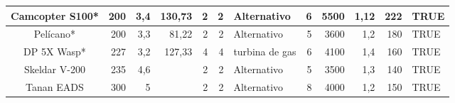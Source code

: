 \begin{table}[htbp]
\begin{tabular}{|c|r|r|r|r|r|l|r|r|r|r|l|}
		\midrule
		\rowcolor[rgb]{ .329,  .506,  .208} \textcolor[rgb]{ 1,  1,  1}{Camcopter S100*} & \cellcolor[rgb]{ .659,  .816,  .553}200 & \cellcolor[rgb]{ .659,  .816,  .553}3,4 & \cellcolor[rgb]{ .659,  .816,  .553}130,73 & \cellcolor[rgb]{ .659,  .816,  .553}2 & \cellcolor[rgb]{ .659,  .816,  .553}2 & \cellcolor[rgb]{ .659,  .816,  .553}Alternativo & \cellcolor[rgb]{ .659,  .816,  .553}6 & \cellcolor[rgb]{ .659,  .816,  .553}5500 & \cellcolor[rgb]{ .659,  .816,  .553}1,12 & \cellcolor[rgb]{ .659,  .816,  .553}222 & \cellcolor[rgb]{ .659,  .816,  .553}TRUE \\
		\midrule
		\rowcolor[rgb]{ .329,  .506,  .208} \textcolor[rgb]{ 1,  1,  1}{Pelícano*} & \cellcolor[rgb]{ .659,  .816,  .553}200 & \cellcolor[rgb]{ .659,  .816,  .553}3,3 & \cellcolor[rgb]{ .659,  .816,  .553}81,22 & \cellcolor[rgb]{ .659,  .816,  .553}2 & \cellcolor[rgb]{ .659,  .816,  .553}2 & \cellcolor[rgb]{ .659,  .816,  .553}Alternativo & \cellcolor[rgb]{ .659,  .816,  .553}5 & \cellcolor[rgb]{ .659,  .816,  .553}3600 & \cellcolor[rgb]{ .659,  .816,  .553}1,2 & \cellcolor[rgb]{ .659,  .816,  .553}180 & \cellcolor[rgb]{ .659,  .816,  .553}TRUE \\
		\midrule
		\rowcolor[rgb]{ .329,  .506,  .208} \textcolor[rgb]{ 1,  1,  1}{DP 5X Wasp*} & \cellcolor[rgb]{ .659,  .816,  .553}227 & \cellcolor[rgb]{ .659,  .816,  .553}3,2 & \cellcolor[rgb]{ .659,  .816,  .553}127,33 & \cellcolor[rgb]{ .659,  .816,  .553}4 & \cellcolor[rgb]{ .659,  .816,  .553}4 & \cellcolor[rgb]{ .659,  .816,  .553}turbina de gas & \cellcolor[rgb]{ .659,  .816,  .553}6 & \cellcolor[rgb]{ .659,  .816,  .553}4100 & \cellcolor[rgb]{ .659,  .816,  .553}1,4 & \cellcolor[rgb]{ .659,  .816,  .553}160 & \cellcolor[rgb]{ .659,  .816,  .553}TRUE \\
		\midrule
		\rowcolor[rgb]{ .329,  .506,  .208} \textcolor[rgb]{ 1,  1,  1}{Skeldar V-200} & \cellcolor[rgb]{ .659,  .816,  .553}235 & \cellcolor[rgb]{ .659,  .816,  .553}4,6 & \cellcolor[rgb]{ 1,  1,  0} & \cellcolor[rgb]{ .659,  .816,  .553}2 & \cellcolor[rgb]{ .659,  .816,  .553}2 & \cellcolor[rgb]{ .659,  .816,  .553}Alternativo & \cellcolor[rgb]{ .659,  .816,  .553}5 & \cellcolor[rgb]{ .659,  .816,  .553}3500 & \cellcolor[rgb]{ .659,  .816,  .553}1,3 & \cellcolor[rgb]{ .659,  .816,  .553}140 & \cellcolor[rgb]{ .659,  .816,  .553}TRUE \\
		\midrule
		\rowcolor[rgb]{ .329,  .506,  .208} \textcolor[rgb]{ 1,  1,  1}{Tanan EADS} & \cellcolor[rgb]{ .659,  .816,  .553}300 & \cellcolor[rgb]{ .659,  .816,  .553}5 & \cellcolor[rgb]{ 1,  1,  0} & \cellcolor[rgb]{ .659,  .816,  .553}2 & \cellcolor[rgb]{ .659,  .816,  .553}2 & \cellcolor[rgb]{ .659,  .816,  .553}Alternativo & \cellcolor[rgb]{ .659,  .816,  .553}8 & \cellcolor[rgb]{ .659,  .816,  .553}4000 & \cellcolor[rgb]{ .659,  .816,  .553}1,2 & \cellcolor[rgb]{ .659,  .816,  .553}150 & \cellcolor[rgb]{ .659,  .816,  .553}TRUE \\

\end{tabular}
\end{table}
